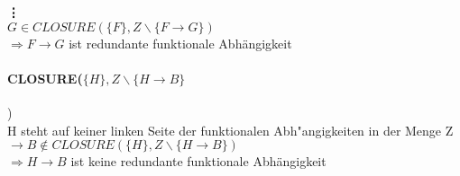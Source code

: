 \documentclass{article}
\begin{document}
			\hspace*{11mm}\textbf{\vdots}\\[1.2em]
			$G \in CLOSURE(\{F\}, Z \backslash \{F \longrightarrow G\})$\\
			$\Rightarrow F \rightarrow G$ ist redundante funktionale Abhängigkeit
	
		\paragraph*{CLOSURE($\{H\}, Z \backslash \{H \rightarrow B\}$})\\
		H steht auf keiner linken Seite der funktionalen Abh"angigkeiten in der Menge Z\\
		$\rightarrow B \notin CLOSURE(\{H\}, Z \backslash \{H \rightarrow B\})$\\ $\Rightarrow H \rightarrow B$ ist keine redundante funktionale Abhängigkeit
		
	
	
\end{document}
